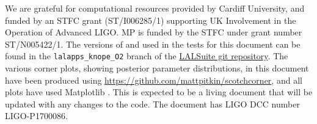 \acknowledgements

We are grateful for computational resources provided by Cardiff University, and funded by an STFC grant (ST/I006285/1) supporting UK Involvement in
the Operation of Advanced LIGO. MP is funded by the STFC under grant number ST/N005422/1. The versions of \lppenf and \lppef used in the tests for this document
can be found in the {\tt lalapps\_knope\_O2} branch of the \href{https://github.com/lscsoft/lalsuite/tree/lalapps_knope_O2}{LALSuite git repository}. The various
corner plots, showing posterior parameter distributions, in this document have been produced using \url{https://github.com/mattpitkin/scotchcorner}, and all
plots have used Matplotlib \citet{Hunter:2007,michael_droettboom_2017_248351}.
This is expected
to be a living document that will be updated with any changes to the code. The document has LIGO DCC number LIGO-P1700086.
